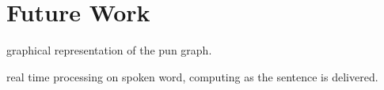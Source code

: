 \section{Future Work}

graphical representation of the pun graph.

real time processing on spoken word, computing as the sentence is delivered.